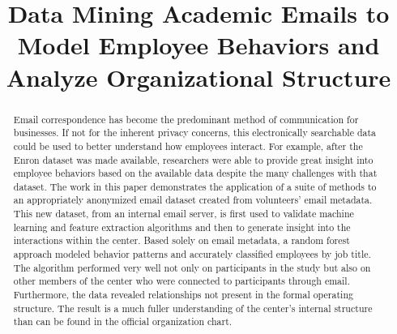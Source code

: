 \documentclass[10pt,twocolumn,conference]{IEEEtran}
\begin{document}
    
\setlength\belowdisplayskip{1.5pt}
\setlength\abovedisplayskip{1.5pt}
\allowdisplaybreaks

	\sloppy
    
    \title{Data Mining Academic Emails to Model Employee Behaviors and Analyze Organizational Structure\vspace{-7.5pt}}
    \author{
        \vspace{-30pt} }
    
\maketitle

\begin{abstract}
Email correspondence has become the predominant method of communication for businesses.  If not for the inherent privacy concerns, this electronically searchable data could be used to better understand how employees interact. For example, after the Enron dataset was made available, researchers were able to provide great insight into employee behaviors based on the available data despite the many challenges with that dataset.  The work in this paper demonstrates the application of a suite of methods to an appropriately anonymized email dataset created from volunteers' email metadata.  This new dataset, from an internal email server, is first used to validate machine learning and feature extraction algorithms and then to generate insight into the interactions within the center.  Based solely on email metadata, a random forest approach modeled behavior patterns and accurately classified employees by job title.  The algorithm performed very well not only on participants in the study but also on other members of the center who were connected to participants through email.  Furthermore, the data revealed relationships not present in the formal operating structure.  The result is a much fuller understanding of the center's internal structure than can be found in the official organization chart.
\end{abstract}
\end{document}
